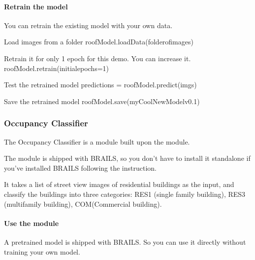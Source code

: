\documentclass[letterpaper,10pt,english]{sphinxmanual}
\begin{document}
\paragraph{Retrain the model}
\label{\detokenize{common/user_manual/modules/roofClassifier:retrain-the-model}}
\sphinxAtStartPar
You can retrain the existing model with your own data.

\begin{sphinxVerbatim}[commandchars=\\\{\}]
\PYGZsh{} Load images from a folder
roofModel.loadData(\PYGZsq{}folder\PYGZhy{}of\PYGZhy{}images\PYGZsq{})

\PYGZsh{} Re\PYGZhy{}train it for only 1 epoch for this demo. You can increase it.
roofModel.retrain(initial\PYGZus{}epochs=1)

\PYGZsh{} Test the re\PYGZhy{}trained model
predictions = roofModel.predict(imgs)

\PYGZsh{} Save the re\PYGZhy{}trained model
roofModel.save(\PYGZsq{}myCoolNewModelv0.1\PYGZsq{})
\end{sphinxVerbatim}


\subsubsection{Occupancy Classifier}
\label{\detokenize{common/user_manual/modules/occupancyClassifier:occupancy-classifier}}\label{\detokenize{common/user_manual/modules/occupancyClassifier:lbl-occupancyclassifier}}\label{\detokenize{common/user_manual/modules/occupancyClassifier::doc}}
\sphinxAtStartPar
The Occupancy Classifier is a module built upon the {\hyperref[\detokenize{common/user_manual/modules/genericImageClassifier:lbl-genericimageclassifier}]{}} module.

\sphinxAtStartPar
The module is shipped with BRAILS,
so you don’t have to install it standalone if you’ve installed BRAILS following the {\hyperref[\detokenize{common/user_manual/installation:lbl-install}]{}} instruction.

\sphinxAtStartPar
It takes a list of street view images of residential buildings as the input, and classify the buildings into three categories:
RES1 (single family building), RES3 (multi\sphinxhyphen{}family building), COM(Commercial building).


\paragraph{Use the module}
\label{\detokenize{common/user_manual/modules/occupancyClassifier:use-the-module}}
\sphinxAtStartPar
A pretrained model is shipped with BRAILS. So you can use it directly without training your own model.
\end{document}
